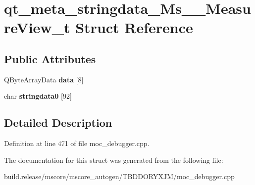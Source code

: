 \hypertarget{structqt__meta__stringdata___ms_____measure_view__t}{}\section{qt\+\_\+meta\+\_\+stringdata\+\_\+\+Ms\+\_\+\+\_\+\+Measure\+View\+\_\+t Struct Reference}
\label{structqt__meta__stringdata___ms_____measure_view__t}
\subsection*{Public Attributes}
\begin{DoxyCompactItemize}
\item 
\mbox{\label{structqt__meta__stringdata___ms_____measure_view__t_a8d84c494ed94147fa46451a13558f7ae}} 
Q\+Byte\+Array\+Data {\bfseries data} \mbox{[}8\mbox{]}
\item 
\mbox{\label{structqt__meta__stringdata___ms_____measure_view__t_add71a4fc79170942ff11e31e2a9eac4d}} 
char {\bfseries stringdata0} \mbox{[}92\mbox{]}
\end{DoxyCompactItemize}


\subsection{Detailed Description}


Definition at line 471 of file moc\+\_\+debugger.\+cpp.



The documentation for this struct was generated from the following file\+:\begin{DoxyCompactItemize}
\item 
build.\+release/mscore/mscore\+\_\+autogen/\+T\+B\+D\+D\+O\+R\+Y\+X\+J\+M/moc\+\_\+debugger.\+cpp\end{DoxyCompactItemize}

